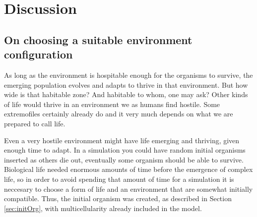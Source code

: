 \chapter{Discussion}



\section{On choosing a suitable environment configuration}


As long as the environment is hospitable enough for the organisms to survive, the emerging population evolves and adapts to thrive in that environment. But how wide is that habitable zone? And habitable to whom, one may ask? Other kinds of life would thrive in an environment we as humans find hostile. Some extremofiles certainly already do  and it very much depends on what we are prepared to call life.

Even a very hostile environment might have life emerging and thriving, given enough time to adapt. In a simulation you could have random initial organisms inserted as others die out, eventually some organism should be able to survive. Biological life needed enormous amounts of time before the emergence of complex life, so in order to avoid spending that amount of time for a simulation it is neccesary to choose a form of life and an environment that are somewhat initially compatible. Thus, the initial organism was created, as described in Section \ref{sec:initOrg}, with multicellularity already included in the model.

